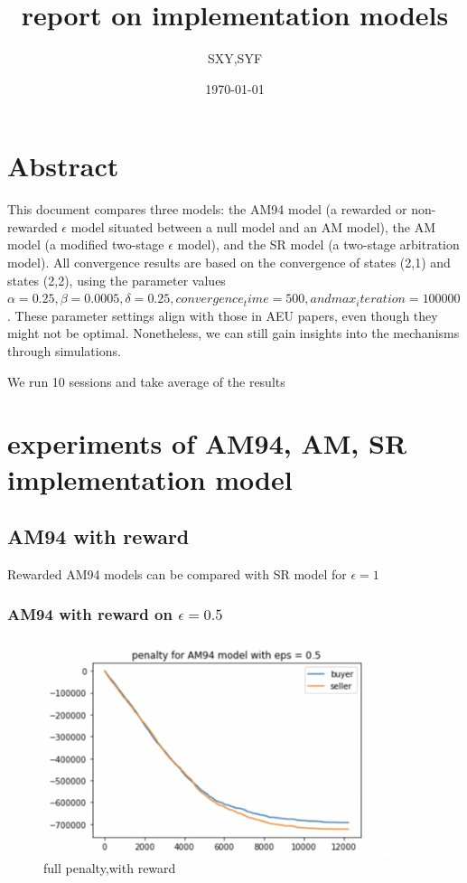 \documentclass[11pt]{article}
\begin{document}
\title{report on implementation models}
\author{SXY,SYF}
\date{\today}

\maketitle %

\section{Abstract}

This document compares three models: the AM94 model (a rewarded or non-rewarded $\epsilon$ 
model situated between a null model and an AM model), the AM model (a modified 
two-stage $\epsilon$ model), and the SR model (a two-stage arbitration model). All convergence 
results are based on the convergence of states (2,1) and states (2,2), using the 
parameter values {$\alpha = 0.25, \beta = 0.0005, \delta = 0.25, convergence_time = 500, 
and max_iteration = 100000$}. These parameter settings align with those in AEU papers, 
even though they might not be optimal. Nonetheless, we can still gain insights into the 
mechanisms through simulations.

We run 10 sessions and take average of the results


\section{experiments of AM94, AM, SR implementation model}

\subsection{AM94 with reward}
Rewarded AM94 models can be compared with SR model for $\epsilon = 1$
\subsubsection{AM94 with reward on $\epsilon = 0.5$}

\begin{figure}[H]
	\begin{center}
	\includegraphics[width=0.9\textwidth]{1.PNG}
	\end{center}
	\caption{full penalty,with reward}
	\label{FIG.1}
\end{figure}
\end{document}
